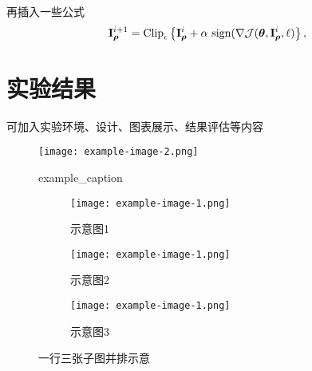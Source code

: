 \documentclass[zihao=-4]{ctexart}
\begin{document}
\begin{spacing}{1.5}
再插入一些公式
\begin{align}
{\bf I}_{\boldsymbol\rho}^{i + 1} = \text{Clip}_{\epsilon} \left \{ {\bf I}_{\boldsymbol\rho}^i + \alpha~\text{sign} (\nabla \mathcal J(\boldsymbol\theta, {\bf I}_{\boldsymbol\rho}^i, \ell) \right \},
\label{eq:BIM}
\end{align}

\section{实验结果}
可加入实验环境、设计、图表展示、结果评估等内容

\begin{figure}[H] %
    \centering %
    \texttt{[image: example-image-2.png]} %
    \caption{example\_caption} %
    \label{example_label} %
\end{figure}

\begin{figure}[htbp]
  \begin{subfigure}{0.31\textwidth}
    \texttt{[image: example-image-1.png]}
    \caption{示意图1} \label{fig:9aaa}
  \end{subfigure}%
  \hspace*{\fill}   %
  \begin{subfigure}{0.31\textwidth}
    \texttt{[image: example-image-1.png]}
    \caption{示意图2} \label{fig:9bbb}
  \end{subfigure}
  \hspace*{\fill}   %
  \begin{subfigure}{0.31\textwidth}
    \texttt{[image: example-image-1.png]}
    \caption{示意图3} \label{fig:9ccc}
    \end{subfigure}
\caption{一行三张子图并排示意}
\label{qmix-train}
\end{figure}



\end{spacing}
\end{document}
